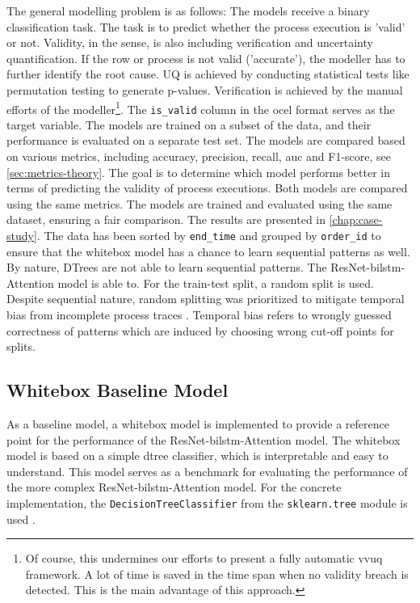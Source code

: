 The general modelling problem is as follows: The models receive a binary classification task. The task is to predict whether the process execution is 'valid' or not. Validity, in the sense, is also including verification and uncertainty quantification. If the row or process is not valid ('accurate'), the modeller has to further identify the root cause. UQ is achieved by conducting statistical tests like permutation testing to generate p-values. Verification is achieved by the manual efforts of the modeller\footnote{Of course, this undermines our efforts to present a fully automatic \gls{vvuq} framework. A lot of time is saved in the time span when no validity breach is detected. This is the main advantage of this approach.}. The \texttt{is\_valid} column in the \gls{ocel} format serves as the target variable. The models are trained on a subset of the data, and their performance is evaluated on a separate test set. The models are compared based on various metrics, including accuracy, precision, recall, \gls{auc} and F1-score, see \autoref{sec:metrics-theory}. The goal is to determine which model performs better in terms of predicting the validity of process executions. Both models are compared using the same metrics. The models are trained and evaluated using the same dataset, ensuring a fair comparison. The results are presented in \autoref{chap:case-study}. The data has been sorted by \texttt{end\_time} and grouped by \texttt{order\_id} to ensure that the whitebox model has a chance to learn sequential patterns as well. By nature, DTrees are not able to learn sequential patterns. The ResNet-\gls{bilstm}-Attention model is able to. For the train-test split, a random split is used. Despite sequential nature, random splitting was prioritized to mitigate temporal bias from incomplete process traces \autocite{morita2022investigation}. Temporal bias refers to wrongly guessed correctness of patterns which are induced by choosing wrong cut-off points for splits.


\subsection{Whitebox Baseline Model}
As a baseline model, a whitebox model is implemented to provide a reference point for the performance of the ResNet-\gls{bilstm}-Attention model. The whitebox model is based on a simple \gls{dtree} classifier, which is interpretable and easy to understand. This model serves as a benchmark for evaluating the performance of the more complex ResNet-\gls{bilstm}-Attention model. For the concrete implementation, the \texttt{DecisionTreeClassifier} from the \texttt{sklearn.tree} module is used \autocite{Scikit-Learn}.

